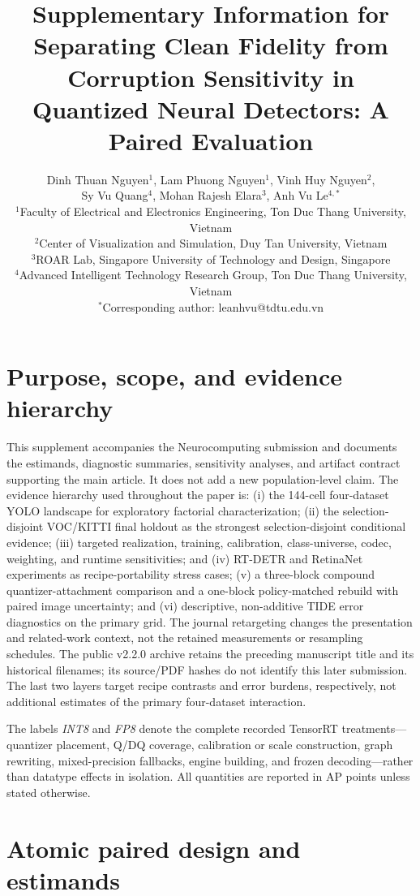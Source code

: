 \documentclass[10pt]{article}
\title{Supplementary Information for\\[1mm]
\textbf{Separating Clean Fidelity from Corruption Sensitivity in Quantized Neural Detectors: A Paired Evaluation}}
\author{Dinh Thuan Nguyen$^{1}$, Lam Phuong Nguyen$^{1}$, Vinh Huy Nguyen$^{2}$,\\
Sy Vu Quang$^{4}$, Mohan Rajesh Elara$^{3}$, Anh Vu Le$^{4,*}$\\[2mm]
\small $^1$Faculty of Electrical and Electronics Engineering, Ton Duc Thang University, Vietnam\\
\small $^2$Center of Visualization and Simulation, Duy Tan University, Vietnam\\
\small $^3$ROAR Lab, Singapore University of Technology and Design, Singapore\\
\small $^4$Advanced Intelligent Technology Research Group, Ton Duc Thang University, Vietnam\\
\small $^*$Corresponding author: leanhvu@tdtu.edu.vn}
\date{}
\begin{document}
\maketitle

\section{Purpose, scope, and evidence hierarchy}

This supplement accompanies the Neurocomputing submission and documents the estimands, diagnostic summaries, sensitivity
analyses, and artifact contract supporting the main article. It does not add a
new population-level claim. The evidence hierarchy used throughout the paper is:
(i) the 144-cell four-dataset YOLO landscape for exploratory factorial
characterization; (ii) the selection-disjoint VOC/KITTI final holdout as the strongest
selection-disjoint conditional evidence; (iii) targeted realization, training,
calibration, class-universe, codec, weighting, and runtime sensitivities; and
(iv) RT-DETR and RetinaNet experiments as recipe-portability stress cases;
(v) a three-block compound quantizer-attachment comparison and a one-block
policy-matched rebuild with paired image uncertainty;
and (vi) descriptive, non-additive TIDE error diagnostics on the primary grid.
The journal retargeting changes the presentation and related-work context, not the retained measurements or resampling schedules. The public v2.2.0 archive retains the preceding manuscript title and its historical filenames; its source/PDF hashes do not identify this later submission.
The last two layers target recipe contrasts and error burdens, respectively,
not additional estimates of the primary four-dataset interaction.

The labels \emph{INT8} and \emph{FP8} denote the complete recorded TensorRT
treatments---quantizer placement, Q/DQ coverage, calibration or scale
construction, graph rewriting, mixed-precision fallbacks, engine building, and
frozen decoding---rather than datatype effects in isolation. All quantities are
reported in AP points unless stated otherwise.

\section{Atomic paired design and estimands}
\end{document}

